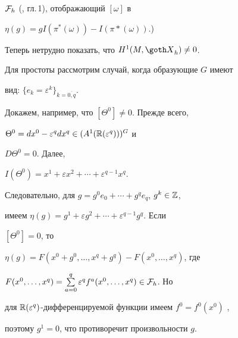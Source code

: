 \begin{exam}
${\cal F}_h$ (\cite{Gish}, гл.\,1), отображающий $[\omega]$ в


$\eta(g) = gI(\pi^*(\omega)) - I(\pi*(\omega))$.)





Теперь нетрудно показать, что $H^1(M, {\goth X}_h) \ne 0$.


Для простоты рассмотрим случай, когда образующие $G$ имеют


вид: $\{e_k = \varepsilon^k\}_{k=\overline{0,q}}$.


Докажем, например, что $[\Theta^0] \ne 0$. Прежде всего,


$\Theta^0 = dx^0 - \varepsilon^q dx^q \in (A^1(\Bbb R(\varepsilon^q)))^G$ и


$D\Theta^0 = 0$. Далее,


$I(\Theta^0) = x^1 + \varepsilon x^2 + \dotsb + \varepsilon^{q-1} x^q$.


Следовательно, для $g = g^0 e_0 + \dotsb + g^q e_q$, $g^k \in {\Bbb Z}$,


имеем $\eta(g) = g^1 + \varepsilon g^2 + \dotsb + \varepsilon^{q-1} g^q$. Если


$[\Theta^0] = 0$, то


$\eta(g) = F(x^0 + g^0, \dotsc, x^q + g^q) - F(x^0, \dotsc, x^q)$, где


$F(x^0, \dotsc, x^q) =


\sum\limits_{a=0}^q \varepsilon^q f^a(x^0, \dotsc, x^q) \in {\cal F}_h$. Но


для $\Bbb R(\varepsilon^q)$-дифференцируемой функции имеем $f^0 = f^0(x^0)$ \cite{Vish},


поэтому $g^1 = 0$, что противоречит произвольности $g$.


\end{exam}





